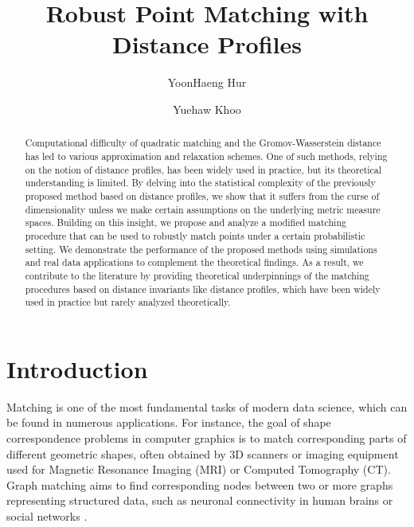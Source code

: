 \documentclass[11pt,letterpaper]{article}
\title{Robust Point Matching with Distance Profiles}
\author[1]{YoonHaeng Hur}
\author[1]{Yuehaw Khoo}
\affil[1]{Department of Statistics, University of Chicago}
\theoremstyle{definition}
\numberwithin{equation}{section}
\begin{document}
\maketitle
\begin{abstract}
    Computational difficulty of quadratic matching and the Gromov-Wasserstein distance has led to various approximation and relaxation schemes. One of such methods, relying on the notion of distance profiles, has been widely used in practice, but its theoretical understanding is limited. By delving into the statistical complexity of the previously proposed method based on distance profiles, we show that it suffers from the curse of dimensionality unless we make certain assumptions on the underlying metric measure spaces. Building on this insight, we propose and analyze a modified matching procedure that can be used to robustly match points under a certain probabilistic setting. We demonstrate the performance of the proposed methods using simulations and real data applications to complement the theoretical findings. As a result, we contribute to the literature by providing theoretical underpinnings of the matching procedures based on distance invariants like distance profiles, which have been widely used in practice but rarely analyzed theoretically.
\end{abstract}

\section{Introduction}
\label{sec:intro}

Matching is one of the most fundamental tasks of modern data science, which can be found in numerous applications. For instance, the goal of shape correspondence problems \citep{van2011survey,sahilliouglu2020recent} in computer graphics is to match corresponding parts of different geometric shapes, often obtained by 3D scanners or imaging equipment used for Magnetic Resonance Imaging (MRI) or Computed Tomography (CT). Graph matching aims to find corresponding nodes between two or more graphs representing structured data, such as neuronal connectivity in human brains \citep{sporns2005human} or social networks \citep{borgatti2009network}. 
\end{document}
